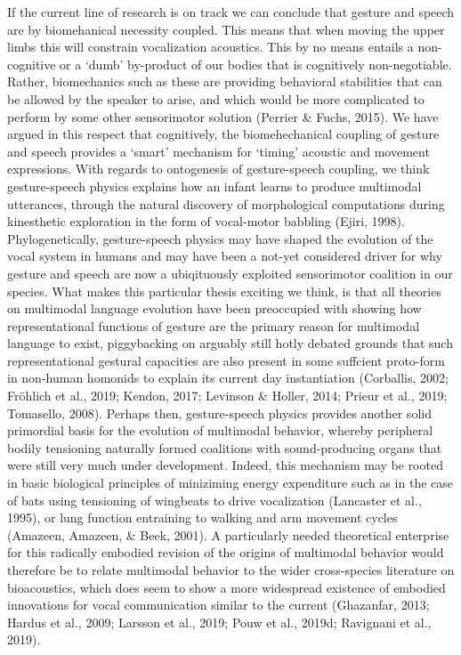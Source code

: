 \documentclass[
  man, noextraspace,floatsintext]{apa6}
\begin{document}
If the current line of research is on track we can conclude that gesture and speech are by biomehanical necessity coupled. This means that when moving the upper limbs this will constrain vocalization acoustics. This by no means entails a non-cognitive or a `dumb' by-product of our bodies that is cognitively non-negotiable. Rather, biomechanics such as these are providing behavioral stabilities that can be allowed by the speaker to arise, and which would be more complicated to perform by some other sensorimotor solution (Perrier \& Fuchs, 2015). We have argued in this respect that cognitively, the biomehechanical coupling of gesture and speech provides a `smart' mechanism for `timing' acoustic and movement expressions. With regards to ontogenesis of gesture-speech coupling, we think gesture-speech physics explains how an infant learns to produce multimodal utterances, through the natural discovery of morphological computations during kinesthetic exploration in the form of vocal-motor babbling (Ejiri, 1998).\\
Phylogenetically, gesture-speech physics may have shaped the evolution of the vocal system in humans and may have been a not-yet considered driver for why gesture and speech are now a ubiqituously exploited sensorimotor coalition in our species. What makes this particular thesis exciting we think, is that all theories on multimodal language evolution have been preoccupied with showing how representational functions of gesture are the primary reason for multimodal language to exist, piggybacking on arguably still hotly debated grounds that such representational gestural capacities are also present in some suffcient proto-form in non-human homonids to explain its current day instantiation (Corballis, 2002; Fröhlich et al., 2019; Kendon, 2017; Levinson \& Holler, 2014; Prieur et al., 2019; Tomasello, 2008). Perhaps then, gesture-speech physics provides another solid primordial basis for the evolution of multimodal behavior, whereby peripheral bodily tensioning naturally formed coalitions with sound-producing organs that were still very much under development. Indeed, this mechanism may be rooted in basic biological principles of miniziming energy expenditure such as in the case of bats using tensioning of wingbeats to drive vocalization (Lancaster et al., 1995), or lung function entraining to walking and arm movement cycles (Amazeen, Amazeen, \& Beek, 2001). A particularly needed theoretical enterprise for this radically embodied revision of the origins of multimodal behavior would therefore be to relate multimodal behavior to the wider cross-species literature on bioacoustics, which does seem to show a more widespread existence of embodied innovations for vocal communication similar to the current (Ghazanfar, 2013; Hardus et al., 2009; Larsson et al., 2019; Pouw et al., 2019d; Ravignani et al., 2019).
\newpage
\end{document}
